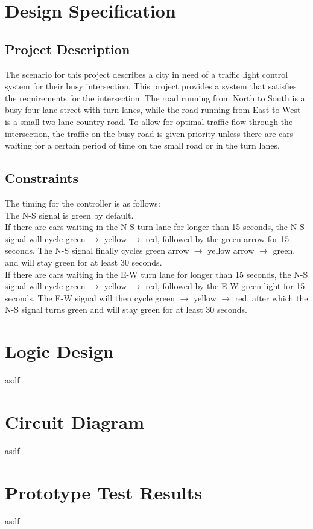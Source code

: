 \section{Design Specification}
\subsection{Project Description}
The scenario for this project describes a city in need of a traffic light control system for their busy intersection.
This project provides a system that satisfies the requirements for the intersection. The road running from North to South is a busy four-lane street with turn lanes,
while the road running from East to West is a small two-lane country road. To allow for optimal traffic flow through the intersection,
the traffic on the busy road is given priority unless there are cars waiting for a certain period of time on the small road or in the turn lanes.

\subsection{Constraints}
The timing for the controller is as follows:\\
The N-S signal is green by default.\\
If there are cars waiting in the N-S turn lane for longer than 15 seconds, the N-S signal will cycle green $\rightarrow$ yellow $\rightarrow$ red, followed by the green arrow for 15 seconds.
The N-S signal finally cycles green arrow $\rightarrow$ yellow arrow $\rightarrow$ green, and will stay green for at least 30 seconds.\\
If there are cars waiting in the E-W turn lane for longer than 15 seconds, the N-S signal will cycle green $\rightarrow$ yellow $\rightarrow$ red, followed by the E-W green light for 15 seconds.
The E-W signal will then cycle green $\rightarrow$ yellow $\rightarrow$ red, after which the N-S signal turns green and will stay green for at least 30 seconds.\\

\section{Logic Design}
asdf

\section{Circuit Diagram}
asdf

\section{Prototype Test Results}
asdf
